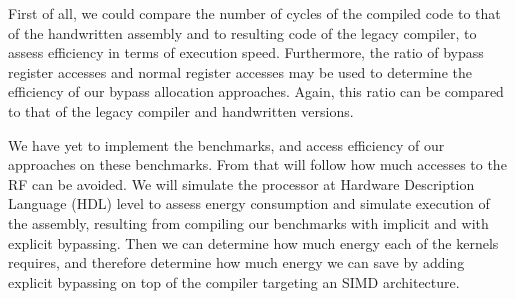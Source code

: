 First of all, we could compare the number of cycles of the compiled code to that of the handwritten assembly and to resulting code of the legacy compiler, to assess efficiency in terms of execution speed. Furthermore, the ratio of bypass register accesses and normal register accesses may be used to determine the efficiency of our bypass allocation approaches. Again, this ratio can be compared to that of the legacy compiler and handwritten versions.

We have yet to implement the benchmarks, and access efficiency of our approaches on these benchmarks. From that will follow how much accesses to the RF can be avoided. We will simulate the processor at Hardware Description Language (HDL) level to assess energy consumption and simulate execution of the assembly, resulting from compiling our benchmarks with implicit and with explicit bypassing. Then we can determine how much energy each of the kernels requires, and therefore determine how much energy we can save by adding explicit bypassing on top of the compiler targeting an SIMD architecture. 